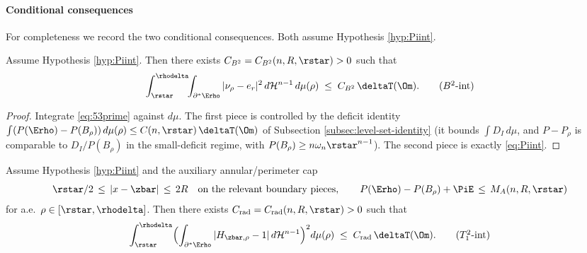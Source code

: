 \paragraph{Conditional consequences}

For completeness we record the two conditional consequences. Both
assume Hypothesis \ref{hyp:Piint}.

\begin{theorem}\label{thm:G3}
Assume Hypothesis \ref{hyp:Piint}. Then there exists
$C_{B^{2}}=C_{B^{2}}(n,R,\rstar)>0$ such that
\begin{equation}\label{eq:B2int}
   \int_{\rstar}^{\rhodelta}\!\!
   \int_{\partial^{*}\Erho}|\nu_{\rho}-e_{r}|^{2}\,d\mathcal H^{n-1}\,d\mu(\rho)
   \;\le\;
   C_{B^{2}}\,\deltaT(\Om).
   \tag{$B^{2}$-int}
\end{equation}
\end{theorem}

\begin{proof}
Integrate \eqref{eq:53prime} against $d\mu$. The first piece is
controlled by the deficit identity
$\int(P(\Erho)-P(B_{\rho}))\,d\mu(\rho)\le C(n,\rstar)\,\deltaT(\Om)$
of Subsection \ref{subsec:level-set-identity} (it bounds
$\int D_{I}\,d\mu$, and $P-P_\rho$ is comparable to
$D_{I}/P(B_{\rho})$ in the small-deficit regime, with
$P(B_{\rho})\ge n\omega_{n}\rstar^{n-1}$). The second piece is
exactly \eqref{eq:Piint}.
\end{proof}

\begin{theorem}\label{thm:T1sq}
Assume Hypothesis \ref{hyp:Piint} and the auxiliary annular/perimeter
cap
\begin{equation}\label{eq:annular-cap}
   \rstar/2 \,\le\,|x-\zbar|\,\le\, 2R
   \quad\text{on the relevant boundary pieces},
   \qquad
   P(\Erho)-P(B_{\rho})+\PiE\,\le\, M_{A}(n,R,\rstar)
\end{equation}
for a.e.\ $\rho\in[\rstar,\rhodelta]$. Then there exists
$C_{\mathrm{rad}}=C_{\mathrm{rad}}(n,R,\rstar)>0$ such that
\begin{equation}\label{eq:T1sqint}
   \int_{\rstar}^{\rhodelta}\Bigl(\int_{\partial^{*}\Erho}
   |H_{\zbar,\rho}-1|\,d\mathcal H^{n-1}\Bigr)^{2}d\mu(\rho)
   \;\le\;
   C_{\mathrm{rad}}\,\deltaT(\Om).
   \tag{$T_{1}^{2}$-int}
\end{equation}
\end{theorem}

